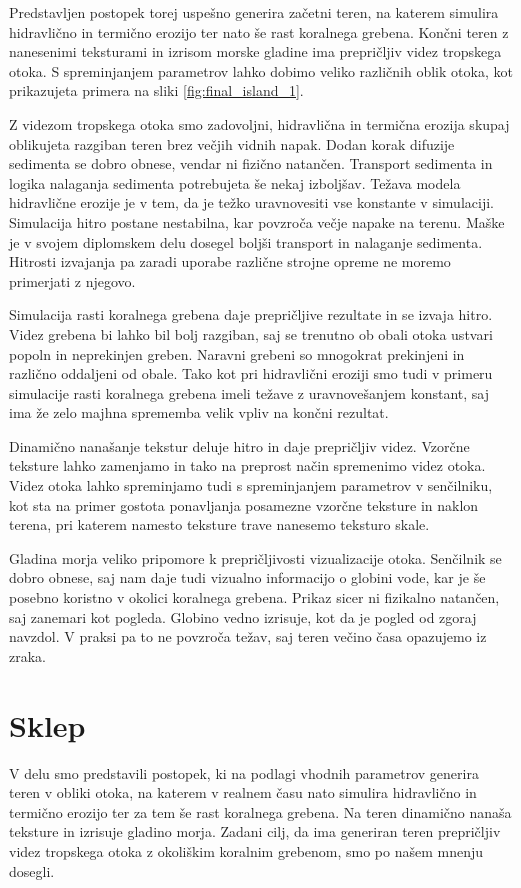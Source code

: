 \documentclass[9pt]{style/friteza}
\begin{document}
Predstavljen postopek torej uspešno generira začetni teren, na katerem simulira hidravlično in termično erozijo ter nato še rast koralnega grebena. Končni teren z nanesenimi teksturami in izrisom morske gladine ima prepričljiv videz tropskega otoka. S spreminjanjem parametrov lahko dobimo veliko različnih oblik otoka, kot prikazujeta primera na sliki \ref{fig:final_island_1}.

Z videzom tropskega otoka smo zadovoljni, hidravlična in termična erozija skupaj oblikujeta razgiban teren brez večjih vidnih napak. Dodan korak difuzije sedimenta se dobro obnese, vendar ni fizično natančen. Transport sedimenta in logika nalaganja sedimenta potrebujeta še nekaj izboljšav. Težava modela hidravlične erozije je v tem, da je težko uravnovesiti vse konstante v simulaciji. Simulacija hitro postane nestabilna, kar povzroča večje napake na terenu. Maške \cite{maske_2013} je v svojem diplomskem delu dosegel boljši transport in nalaganje sedimenta. Hitrosti izvajanja pa zaradi uporabe različne strojne opreme ne moremo primerjati z njegovo.

Simulacija rasti koralnega grebena daje prepričljive rezultate in se izvaja hitro. Videz grebena bi lahko bil bolj razgiban, saj se trenutno ob obali otoka ustvari popoln in neprekinjen greben. Naravni grebeni so mnogokrat prekinjeni in različno oddaljeni od obale. Tako kot pri hidravlični eroziji smo tudi v primeru simulacije rasti koralnega grebena imeli težave z uravnovešanjem konstant, saj ima že zelo majhna sprememba velik vpliv na končni rezultat.

Dinamično nanašanje tekstur deluje hitro in daje prepričljiv videz. Vzorčne teksture lahko zamenjamo in tako na preprost način spremenimo videz otoka. Videz otoka lahko spreminjamo tudi s spreminjanjem parametrov v senčilniku, kot sta na primer gostota ponavljanja posamezne vzorčne teksture in naklon terena, pri katerem namesto teksture trave nanesemo teksturo skale.

Gladina morja veliko pripomore k prepričljivosti vizualizacije otoka. Senčilnik se dobro obnese, saj nam daje tudi vizualno informacijo o globini vode, kar je še posebno koristno v okolici koralnega grebena. Prikaz sicer ni fizikalno natančen, saj zanemari kot pogleda. Globino vedno izrisuje, kot da je pogled od zgoraj navzdol. V praksi pa to ne povzroča težav, saj teren večino časa opazujemo iz zraka.

\section{Sklep}
V delu smo predstavili postopek, ki na podlagi vhodnih parametrov generira teren v obliki otoka, na katerem v realnem času nato simulira hidravlično in termično erozijo ter za tem še rast koralnega grebena. Na teren dinamično nanaša teksture in izrisuje gladino morja. Zadani cilj, da ima generiran teren prepričljiv videz tropskega otoka z okoliškim koralnim grebenom, smo po našem mnenju dosegli.
\end{document}
